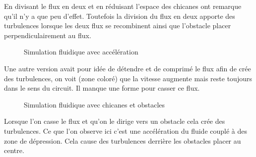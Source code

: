 \documentclass[a4paper, 11pt]{article}
\begin{document}
En divisant le flux en deux et en réduisant l'espace des chicanes ont remarque qu'il n'y a que peu d'effet.
Toutefois la division du flux en deux apporte des turbulences lorsque les deux flux se recombinent ainsi que l'obstacle placer perpendiculairement au flux.
\begin{figure}[H]
    \centering
    \caption{Simulation fluidique avec accélération}
    \label{fig:simulation4}
\end{figure}
Une autre version avait pour idée de détendre et de comprimé le flux afin de crée des turbulences, on voit (zone coloré) que la vitesse augmente mais reste toujours dans le sens du circuit.
Il manque une forme pour casser ce flux.
\begin{figure}[H]
    \centering
    \caption{Simulation fluidique avec chicanes et obstacles}
    \label{fig:simulation5}
\end{figure}
Lorsque l'on casse le flux et qu'on le dirige vers un obstacle cela crée des turbulences.
Ce que l'on observe ici c'est une accélération du fluide couplé à des zone de dépression.
Cela cause des turbulences derrière les obstacles placer au centre.
\end{document}
